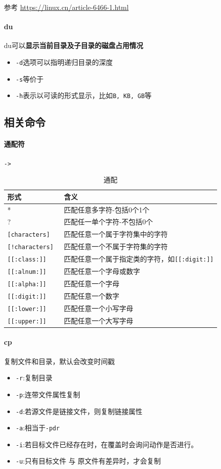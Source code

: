 \documentclass[UTF8,a4paper,12pt]{ctexbook}
\newcommand{\erhao}{\fontsize{21pt}{\baselineskip}\selectfont}
\begin{document}
			 参考 \url{https://linux.cn/article-6466-1.html}
			\paragraph{du}du可以\textbf{显示当前目录及子目录的磁盘占用情况}
				\begin{itemize}
					\item \verb|-d|选项可以指明递归目录的深度
					\item \verb|-s|等价于\erhao
					\item \verb|-h|表示以可读的形式显示，比如\verb|B, KB, GB|等
				\end{itemize}
		
		\subsection{相关命令}
		\paragraph{通配符}\verb|->|
			\begin{table}[H]
				\centering
				\caption{通配}
				\begin{tabular}{l|m{14cm}}
					\toprule[1.5pt]
						形式 	   	   & 含义\\
					\hline
						*			 & 匹配任意多字符-包括0个1个\\
						?			& 匹配任一单个字符-不包括0个\\
						\verb|[characters]	|	& 匹配任意一个属于字符集中的字符\\
						\verb|[!characters] |		& 匹配任意一个不属于字符集的字符\\
						\verb|[[:class:]]   |		& 匹配任意一个属于指定类的字符，如\verb|[[:digit:]]|\\
						\verb|[[:alnum:]]	|		& 匹配任意一个字母或数字\\
						\verb|[[:alpha:]]	|		& 匹配任意一个字母\\
						\verb|[[:digit:]]	|		& 匹配任意一个数字\\
						\verb|[[:lower:]]	|		& 匹配任意一个小写字母\\
						\verb|[[:upper:]]	|		& 匹配任意一个大写字母\\
					\bottomrule[1.5pt]
				\end{tabular}
			\end{table}

		\paragraph{cp} 复制文件和目录，默认会改变时间戳
			\begin{itemize}[itemindent = 1em]
				\item \verb|-r|:复制目录
				\item \verb|-p|:连带文件属性复制
				\item \verb|-d|:若源文件是链接文件，则复制链接属性
				\item \verb|-a|:相当于\verb|-pdr|
				\item \verb|-i|:若目标文件已经存在时，在覆盖时会询问动作是否进行。
				\item \verb|-u|:只有目标文件 与 原文件有差异时，才会复制
			\end{itemize}
			
\end{document}
